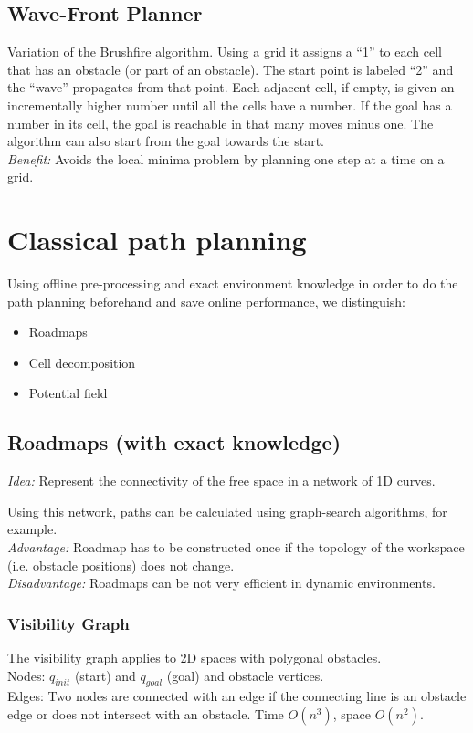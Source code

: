 \begin{multicols*}{2}
\subsection{Wave-Front Planner}
Variation of the Brushfire algorithm. Using a grid it assigns a “1” to each cell that has an obstacle (or part of an obstacle).
The start point is labeled “2” and the “wave” propagates from that point. Each adjacent cell, if empty, is given an incrementally higher number until all the cells have a number.
If the goal has a number in its cell, the goal is reachable in that many moves minus one.
The algorithm can also start from the goal towards the start.\\
\textit{Benefit:} Avoids the local minima problem by planning one step at a time on a grid.

\section{Classical path planning}
Using offline pre-processing and exact environment knowledge in order to do the path planning beforehand and save online performance, we distinguish:
\begin{itemize}
	\item Roadmaps
	\item Cell decomposition
	\item Potential field
\end{itemize}

\subsection{Roadmaps (with exact knowledge)}
\textit{Idea:} Represent the connectivity of the free space in a network of 1D curves.\par
Using this network, paths can be calculated using graph-search algorithms, for example.\\ \textit{Advantage:} Roadmap has to be constructed once if the topology of the workspace (i.e. obstacle positions) does not change.\\
\textit{Disadvantage:} Roadmaps can be not very efficient in dynamic environments.

\subsubsection{Visibility Graph}
The visibility graph applies to 2D spaces with polygonal obstacles.\\
Nodes: $q_{init}$ (start) and $q_{goal}$ (goal) and obstacle vertices.\\
Edges: Two nodes are connected with an edge if the connecting line is an obstacle edge or does not intersect with an obstacle.
Time $O(n^3)$, space $O(n^2)$.


\end{multicols*}

